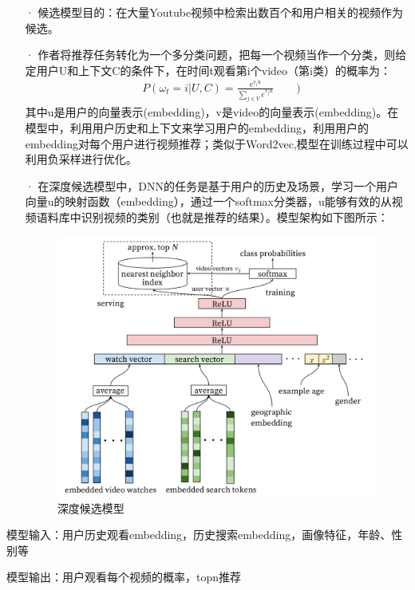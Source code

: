 \documentclass[UTF8]{ctexart}
\begin{document}
    \begin{itemize}
		\item[·] 候选模型目的：在大量Youtube视频中检索出数百个和用户相关的视频作为候选。
		\item[·] 作者将推荐任务转化为一个多分类问题，把每一个视频当作一个分类，则给定用户U和上下文C的条件下，在时间t观看第i个video（第i类）的概率为：
		\begin{equation}\label{eq:gongshi1}
			\begin{aligned}
		    	&P(\omega_t=i|U,C)=\frac{e^{v_iu}}{\sum_{j\in V}e^{v_ju}}\qquad)
    		\end{aligned}
    	\end{equation}
    	其中u是用户的向量表示(embedding)，v是video的向量表示(embedding)。在模型中，利用用户历史和上下文来学习用户的embedding，利用用户的embedding对每个用户进行视频推荐；类似于Word2vec,模型在训练过程中可以利用负采样进行优化。
    	\item[·] 在深度候选模型中，DNN的任务是基于用户的历史及场景，学习一个用户向量u的映射函数（embedding），通过一个softmax分类器，u能够有效的从视频语料库中识别视频的类别（也就是推荐的结果）。模型架构如下图所示：
		\begin{figure}[ht]
	        \centering
	        \includegraphics[scale=0.5]{picture/002.png}
	        \caption{深度候选模型}
	        \label{fig:002}
	    \end{figure}
		\end{itemize}
		模型输入：用户历史观看embedding，历史搜索embedding，画像特征，年龄、性别等

		模型输出：用户观看每个视频的概率，topn推荐
\end{document}
